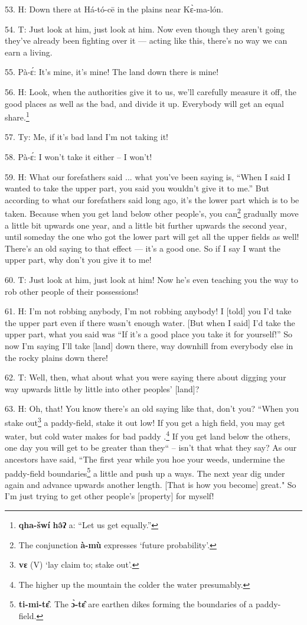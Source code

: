53. H: Down there at Há-tó-cē in the plains near Kɛ̀-ma-lón.

54. T: Just look at him, just look at him. Now even though they aren't going
they've already been fighting over it --- acting like this, there's no way we can
earn a living.

55. Pà-ɛ́: It's mine, it's mine! The land down there is mine!

56. H: Look, when the authorities give it to us, we'll carefully measure it off,
the good places as well as the bad, and divide it up. Everybody will get an equal
share.\footnote{\textbf{qha-šwí} \textbf{hə̂ʔ} a: ``Let us get equally.''}

57. Ty: Me, if it's bad land I'm not taking it!

58. Pà-ɛ́: I won't take it either -- I won't!

59. H: What our forefathers said ... what you've been saying is, ``When I said I
wanted to take the upper part, you said you wouldn't give it to me.'' But according
to what our forefathers said long ago, it's the lower part which is to be taken.
Because when you get land below other people's, you can\footnote{The conjunction \textbf{à-mù} expresses `future probability'.} gradually move a little
bit upwards one year, and a little bit further upwards the second year, until someday
the one who got the lower part will get all the upper fields as well! There's an
old saying to that effect --- it's a good one. So if I say I want the upper part,
why don't you give it to me!

60. T: Just look at him, just look at him! Now he's even teaching you the way
to rob other people of their possessions!

61. H: I'm not robbing anybody, I'm not robbing anybody! I [told] you I'd take the
upper part even if there wasn't enough water. [But when I said] I'd take the upper
part, what you said was ``If it's a good place you take it for yourself!''
So now I'm saying I'll take [land] down there, way downhill from everybody else
in the rocky plains down there!

62. T: Well, then, what about what you were saying there about digging your
way upwards little by little into other peoples' [land]?

63. H:  Oh, that! You know there's an old saying like
that, don't you? ``When you stake out\footnote{\textbf{vɛ} (V) `lay claim to; stake out'.} a paddy-field, stake it out
low! If you get a high field, you may get water, but cold water makes for bad paddy
.\footnote{The higher up the mountain the colder the water presumably.} If you get land below the others, one day you will get to be greater than
they`` -- isn't that what they say? As our ancestors have said, ``The
first year while you hoe your weeds, undermine the paddy-field boundaries\footnote{\textbf{ti-mi-tɛ̂}. The \textbf{ɔ̀-tɛ̂} are earthen dikes forming the boundaries of a paddy-field.} a
little and push up a ways. The next year dig under again and advance upwards another
length. [That is how you become] great." So I'm just trying to get other
people's [property] for myself!

